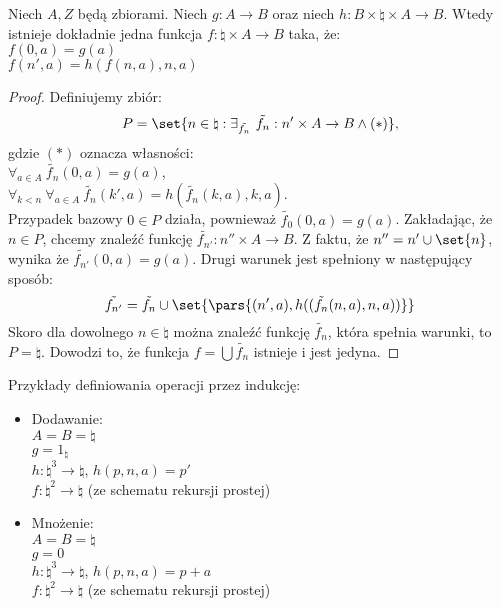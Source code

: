 \begin{theorem}
    Niech \( A, Z \) będą zbiorami. Niech \( g : A \rightarrow B \) oraz niech \( h : B \times \natural \times A \rightarrow B \).
    Wtedy istnieje dokładnie jedna funkcja \( f : \natural \times A \rightarrow B \) taka, że: \\
    \( f(0, a) = g(a) \) \\
    \( f(n', a) = h(f(n, a), n, a) \)
\end{theorem}
\begin{proof}
    Definiujemy zbiór:
    \[
        P = \set{n \in \natural : \exists_{\tilde{f_n}} \ \tilde{f_n} : n' \times A \rightarrow B \land (\ast)},
    \]
    gdzie \( (\ast) \) oznacza własności: \\
    \( \forall_{a \in A} \ \tilde{f_n}(0, a) = g(a) \), \\
    \( \forall_{k < n} \ \forall_{a \in A} \ \tilde{f_n}(k', a) = h(\tilde{f_n}(k, a), k, a) \). \\
    Przypadek bazowy \( 0 \in P \) działa, pownieważ \( \tilde{f_0}(0, a) = g(a) \). Zakładając, że \( n \in P \), chcemy znaleźć funkcję \( \tilde{f_{n'}} : n'' \times A \rightarrow B \).
    Z faktu, że \( n'' = n' \cup \set{n} \), wynika że \( \tilde{f_{n'}}(0, a) = g(a) \). Drugi warunek jest spełniony w następujący sposób:
    \[
        \tilde{f_{n'}} = \tilde{f_n} \cup \set{\pars{(n', a), h((\tilde{f_n}(n, a), n, a))}}
    \]
    Skoro dla dowolnego \( n \in \natural \) można znaleźć funkcję \( \tilde{f_n} \), która spełnia warunki, to~\( P =  \natural \). Dowodzi to, że funkcja \( f = \bigcup \tilde{f_n} \) istnieje i jest jedyna.
\end{proof}

Przykłady definiowania operacji przez indukcję:
\begin{itemize}
    \item Dodawanie: \\
    \( A = B = \natural \) \\
    \( g = 1_{\natural} \) \\
    \( h : \natural^3 \rightarrow \natural \), \( h(p, n, a) = p' \) \\
    \( f : \natural^2 \rightarrow \natural \) (ze schematu rekursji prostej)
    \item Mnożenie: \\
    \( A = B = \natural \) \\
    \( g = 0 \) \\
    \( h : \natural^3 \rightarrow \natural \), \( h(p, n, a) = p + a \) \\
    \( f : \natural^2 \rightarrow \natural \) (ze schematu rekursji prostej)
\end{itemize}